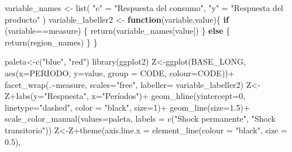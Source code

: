 \documentclass[
]{book}
\newenvironment{Shaded}{\begin{snugshade}}{\end{snugshade}}
\newcommand{\AttributeTok}[1]{\textcolor[rgb]{0.77,0.63,0.00}{#1}}
\newcommand{\ControlFlowTok}[1]{\textcolor[rgb]{0.13,0.29,0.53}{\textbf{#1}}}
\newcommand{\DecValTok}[1]{\textcolor[rgb]{0.00,0.00,0.81}{#1}}
\newcommand{\FloatTok}[1]{\textcolor[rgb]{0.00,0.00,0.81}{#1}}
\newcommand{\FunctionTok}[1]{\textcolor[rgb]{0.00,0.00,0.00}{#1}}
\newcommand{\NormalTok}[1]{#1}
\newcommand{\OtherTok}[1]{\textcolor[rgb]{0.56,0.35,0.01}{#1}}
\newcommand{\SpecialCharTok}[1]{\textcolor[rgb]{0.00,0.00,0.00}{#1}}
\newcommand{\StringTok}[1]{\textcolor[rgb]{0.31,0.60,0.02}{#1}}
\begin{document}
\begin{Shaded}
\begin{Highlighting}[]
\NormalTok{variable\_names }\OtherTok{\textless{}{-}} \FunctionTok{list}\NormalTok{(}
  \StringTok{"c"} \OtherTok{=} \StringTok{"Respuesta del consumo"}\NormalTok{,}
  \StringTok{"y"} \OtherTok{=} \StringTok{"Respuesta del producto"}
\NormalTok{)}
\NormalTok{variable\_labeller2 }\OtherTok{\textless{}{-}} \ControlFlowTok{function}\NormalTok{(variable,value)\{}
  \ControlFlowTok{if}\NormalTok{ (variable}\SpecialCharTok{==}\StringTok{\textquotesingle{}measure\textquotesingle{}}\NormalTok{) \{}
    \FunctionTok{return}\NormalTok{(variable\_names[value])}
\NormalTok{  \} }\ControlFlowTok{else}\NormalTok{ \{}
    \FunctionTok{return}\NormalTok{(region\_names)}
\NormalTok{  \}}
\NormalTok{\}}

\NormalTok{paleta}\OtherTok{\textless{}{-}}\FunctionTok{c}\NormalTok{(}\StringTok{"blue"}\NormalTok{, }\StringTok{"red"}\NormalTok{)}
\FunctionTok{library}\NormalTok{(ggplot2)}
\NormalTok{Z}\OtherTok{\textless{}{-}}\FunctionTok{ggplot}\NormalTok{(BASE\_LONG, }\FunctionTok{aes}\NormalTok{(}\AttributeTok{x=}\NormalTok{PERIODO, }\AttributeTok{y=}\NormalTok{value, }\AttributeTok{group =}\NormalTok{ CODE,}
                         \AttributeTok{colour=}\NormalTok{CODE))}\SpecialCharTok{+}
  \FunctionTok{facet\_wrap}\NormalTok{(.}\SpecialCharTok{\textasciitilde{}}\NormalTok{measure, }\AttributeTok{scales=}\StringTok{"free"}\NormalTok{, }\AttributeTok{labeller=}\NormalTok{ variable\_labeller2)}
\NormalTok{Z}\OtherTok{\textless{}{-}}\NormalTok{Z}\SpecialCharTok{+}\FunctionTok{labs}\NormalTok{(}\AttributeTok{y=}\StringTok{"Respuesta"}\NormalTok{,}
          \AttributeTok{x=}\StringTok{"Períodos"}\NormalTok{)}\SpecialCharTok{+}
  \FunctionTok{geom\_hline}\NormalTok{(}\AttributeTok{yintercept=}\DecValTok{0}\NormalTok{, }\AttributeTok{linetype=}\StringTok{"dashed"}\NormalTok{,}
             \AttributeTok{color =} \StringTok{"black"}\NormalTok{, }\AttributeTok{size=}\DecValTok{1}\NormalTok{)}\SpecialCharTok{+}
  \FunctionTok{geom\_line}\NormalTok{(}\AttributeTok{size=}\FloatTok{1.5}\NormalTok{)}\SpecialCharTok{+}
  \FunctionTok{scale\_color\_manual}\NormalTok{(}\AttributeTok{values=}\NormalTok{paleta,}
                     \AttributeTok{labels =} \FunctionTok{c}\NormalTok{(}\StringTok{"Shock permanente"}\NormalTok{, }
                                \StringTok{"Shock transitorio"}\NormalTok{))}
\NormalTok{Z}\OtherTok{\textless{}{-}}\NormalTok{Z}\SpecialCharTok{+}\FunctionTok{theme}\NormalTok{(}\AttributeTok{axis.line.x =} \FunctionTok{element\_line}\NormalTok{(}\AttributeTok{colour =} \StringTok{"black"}\NormalTok{, }\AttributeTok{size =} \FloatTok{0.5}\NormalTok{),}

\end{Highlighting}
\end{Shaded}
\end{document}
